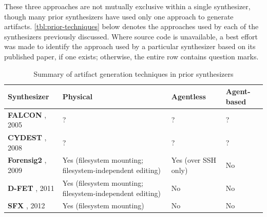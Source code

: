\documentclass[letterpaper,12pt]{report}
\begin{document}
These three approaches are not mutually exclusive within a single
synthesizer, though many prior synthesizers have used only one approach
to generate artifacts. \autoref{tbl:prior-techniques} below denotes the
approaches used by each of the synthesizers previously discussed. Where
source code is unavailable, a best effort was made to identify the
approach used by a particular synthesizer based on its published paper,
if one exists; otherwise, the entire row contains question marks.


{
\small %
\begin{longtable}[]{@{}
  >{\raggedright\arraybackslash}p{}
  >{\raggedright\arraybackslash}p{}
  >{\raggedright\arraybackslash}p{}
  >{\raggedright\arraybackslash}p{}
@{}}
\caption{Summary of artifact generation techniques in prior synthesizers}\label{tbl:prior-techniques} \\
\toprule\noalign{}
\begin{minipage}[b]{\linewidth}\raggedright
Synthesizer
\end{minipage} & \begin{minipage}[b]{\linewidth}\raggedright
Physical
\end{minipage} & \begin{minipage}[b]{\linewidth}\raggedright
Agentless
\end{minipage} & \begin{minipage}[b]{\linewidth}\raggedright
Agent-based
\end{minipage} \\
\midrule\noalign{}
\endhead
\bottomrule\noalign{}
\endlastfoot
\textbf{FALCON} \cite{adelsteinAutomaticallyCreatingRealistic2005},
2005 & ? & ? & ? \\
\textbf{CYDEST} \cite{bruecknerAutomatedComputerForensics2008}, 2008
& ? & ? & ? \\
\textbf{Forensig2}
\cite{mochForensicImageGenerator2009,mochEvaluatingForensicImage2012},
2009 & Yes (filesystem mounting; filesystem-independent editing) & Yes
(over SSH only) & No \\
\textbf{D-FET} \cite{williamCloudbasedDigitalForensics2011}, 2011 &
Yes (filesystem mounting; filesystem-independent editing) & No & No \\
\textbf{SFX} \cite{russellForensicImageDescription2012}, 2012 & Yes
(filesystem mounting) & No & No \\

\end{longtable}}
\end{document}
